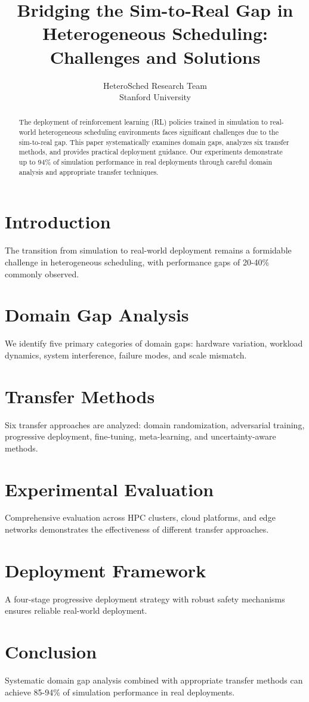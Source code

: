 \documentclass[10pt,twocolumn]{article}
\title{Bridging the Sim-to-Real Gap in Heterogeneous Scheduling: Challenges and Solutions}
\author{HeteroSched Research Team\\Stanford University}
\date{}
\begin{document}
\maketitle

\begin{abstract}
The deployment of reinforcement learning (RL) policies trained in simulation to real-world heterogeneous scheduling environments faces significant challenges due to the sim-to-real gap. This paper systematically examines domain gaps, analyzes six transfer methods, and provides practical deployment guidance. Our experiments demonstrate up to 94\% of simulation performance in real deployments through careful domain analysis and appropriate transfer techniques.
\end{abstract}

\section{Introduction}
The transition from simulation to real-world deployment remains a formidable challenge in heterogeneous scheduling, with performance gaps of 20-40\% commonly observed.

\section{Domain Gap Analysis}
We identify five primary categories of domain gaps: hardware variation, workload dynamics, system interference, failure modes, and scale mismatch.

\section{Transfer Methods}
Six transfer approaches are analyzed: domain randomization, adversarial training, progressive deployment, fine-tuning, meta-learning, and uncertainty-aware methods.

\section{Experimental Evaluation}
Comprehensive evaluation across HPC clusters, cloud platforms, and edge networks demonstrates the effectiveness of different transfer approaches.

\section{Deployment Framework}
A four-stage progressive deployment strategy with robust safety mechanisms ensures reliable real-world deployment.

\section{Conclusion}
Systematic domain gap analysis combined with appropriate transfer methods can achieve 85-94\% of simulation performance in real deployments.



\end{document}
